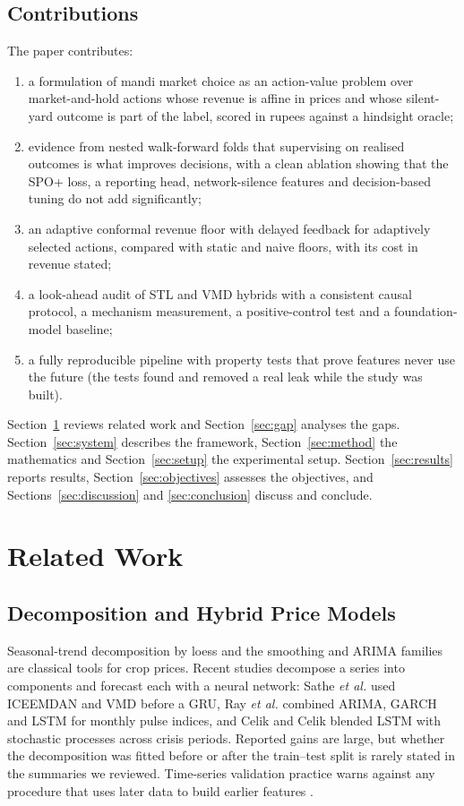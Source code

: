 \documentclass{ieeeaccess}
\begin{document}
\subsection{Contributions}
The paper contributes:
\begin{enumerate}
\item a formulation of mandi market choice as an action-value problem over \NAct{} market-and-hold actions whose revenue is affine in prices and whose silent-yard outcome is part of the label, scored in rupees against a hindsight oracle;
\item evidence from \NFold{} nested walk-forward folds that supervising on realised outcomes is what improves decisions, with a clean ablation showing that the SPO+ loss, a reporting head, network-silence features and decision-based tuning do not add significantly;
\item an adaptive conformal revenue floor with delayed feedback for adaptively selected actions, compared with static and naive floors, with its cost in revenue stated;
\item a look-ahead audit of STL and VMD hybrids with a consistent causal protocol, a mechanism measurement, a positive-control test and a foundation-model baseline;
\item a fully reproducible pipeline with property tests that prove features never use the future (the tests found and removed a real leak while the study was built).
\end{enumerate}

Section~\ref{sec:related} reviews related work and Section~\ref{sec:gap} analyses the gaps. Section~\ref{sec:system} describes the framework, Section~\ref{sec:method} the mathematics and Section~\ref{sec:setup} the experimental setup. Section~\ref{sec:results} reports results, Section~\ref{sec:objectives} assesses the objectives, and Sections~\ref{sec:discussion} and \ref{sec:conclusion} discuss and conclude.

\section{Related Work}
\label{sec:related}
\subsection{Decomposition and Hybrid Price Models}
Seasonal-trend decomposition by loess \cite{cleveland1990} and the smoothing and ARIMA families \cite{hyndman2021} are classical tools for crop prices. Recent studies decompose a series into components and forecast each with a neural network: Sathe \emph{et al.} \cite{sathe2025} used ICEEMDAN and VMD \cite{dragomiretskiy2014} before a GRU, Ray \emph{et al.} \cite{ray2023} combined ARIMA, GARCH and LSTM for monthly pulse indices, and Celik and Celik \cite{celik2025} blended LSTM with stochastic processes across crisis periods. Reported gains are large, but whether the decomposition was fitted before or after the train--test split is rarely stated in the summaries we reviewed. Time-series validation practice warns against any procedure that uses later data to build earlier features \cite{bergmeir2012,cerqueira2020}.
\end{document}
